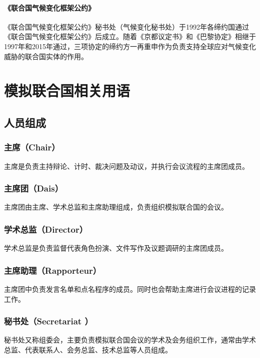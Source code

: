 \documentclass[a4paper,openany]{book}
\begin{document}
\subsubsection{《联合国气候变化框架公约》}
《联合国气候变化框架公约》秘书处（气候变化秘书处）于1992年各缔约国通过《联合国气候变化框架公约》后成立。随着《京都议定书》和《巴黎协定》相继于1997年和2015年通过，三项协定的缔约方一再重申作为负责支持全球应对气候变化威胁的联合国实体的作用。

\chapter{模拟联合国相关用语}

\section{人员组成}

\subsection*{主席（Chair）}

主席是负责主持辩论、计时、裁决问题及动议，并执行会议流程的主席团成员。

\subsection*{主席团（Dais）}

主席团由主席、学术总监和主席助理组成，负责组织模拟联合国的会议。

\subsection*{学术总监（Director）}

学术总监是负责监督代表角色扮演、文件写作及议题调研的主席团成员。

\subsection*{主席助理（Rapporteur）}

主席团中负责发言名单和点名程序的成员。同时也会帮助主席进行会议进程的记录工作。

\subsection*{秘书处（Secretariat ）}

秘书处又称组委会，主要负责模拟联合国会议的学术及会务组织工作，通常由学术总监、代表联系人、会务总监、技术总监等人员组成。
\end{document}
